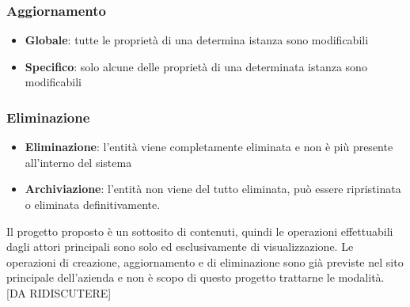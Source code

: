 \documentclass[12pt,italian,]{report}
\providecommand{\tightlist}{%
  \setlength{\itemsep}{0pt}\setlength{\parskip}{0pt}}
\begin{document}
\hypertarget{aggiornamento}{%
\subsubsection{Aggiornamento}\label{aggiornamento}}

\begin{itemize}
\tightlist
\item
  \textbf{Globale}: tutte le proprietà di una determina istanza sono
  modificabili
\item
  \textbf{Specifico}: solo alcune delle proprietà di una determinata
  istanza sono modificabili
\end{itemize}

\hypertarget{eliminazione}{%
\subsubsection{Eliminazione}\label{eliminazione}}

\begin{itemize}
\tightlist
\item
  \textbf{Eliminazione}: l'entità viene completamente eliminata e non è
  più presente all'interno del sistema
\item
  \textbf{Archiviazione}: l'entità non viene del tutto eliminata, può
  essere ripristinata o eliminata definitivamente.
\end{itemize}

Il progetto proposto è un sottosito di contenuti, quindi le operazioni
effettuabili dagli attori principali sono solo ed esclusivamente di
visualizzazione. Le operazioni di creazione, aggiornamento e di
eliminazione sono già previste nel sito principale dell'azienda e non è
scopo di questo progetto trattarne le modalità. {[}DA RIDISCUTERE{]}
\end{document}
